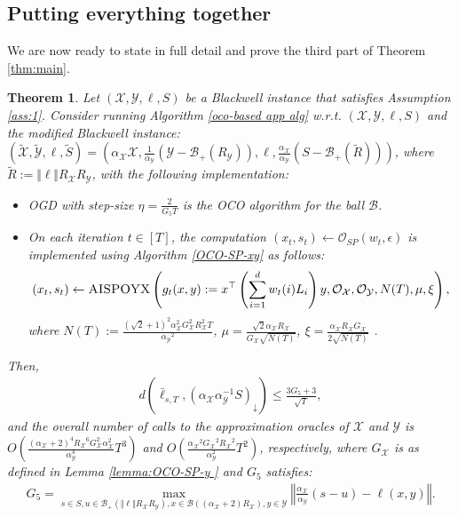 \documentclass[a4paper,12pt]{article}
\newtheorem{theorem} {Theorem}
\newcommand{\mY}{\mathcal{Y}}
\newcommand{\mX}{\mathcal{X}}
\newcommand{\mB}{\mathcal{B}}
\newcommand{\oraclesp}{\mathcal{O}_{SP}}
\newcommand{\oraclex}{\mathcal{O}_{\mX}}
\newcommand{\oracley}{\mathcal{O}_{\mY}}
\begin{document}
\subsection{Putting everything together}
We are now ready to state in full detail and prove the third part of Theorem \ref{thm:main}.
\begin{theorem}\label{thoerem: app on xy} 
Let $(\mX,\mY,\ell,S)$ be a Blackwell instance that satisfies Assumption \ref{ass:1}. Consider running Algorithm \ref{oco-based app  alg} w.r.t. $(\mX,\mY,\ell,S)$ and the modified Blackwell instance:
$(\tilde{\mX}, \tilde{\mY}, \ell, \tilde{S}) = \left({\alpha_{\mX}\mX, \frac{1}{\alpha_{\mY}}(\mY-\mB_+(R_{\mY})), \ell, \frac{\alpha_{\mX}}{\alpha_{\mY}}(S-\mB_{+}(\tilde{R}))}\right)$,
where  $\tilde{R}:=\Vert \ell \Vert R_\mX R_\mY$, with the following implementation:
\begin{itemize}
\item
OGD with step-size $\eta= \frac{2}{G_5 T}$ is the OCO algorithm for the ball $\mB$.
\item
On each iteration $t\in[T]$, the computation $(x_t,s_t)\gets \oraclesp(w_t, \epsilon)$ is implemented using Algorithm \ref{OCO-SP-xy} as follows:
\begin{align*}
\left(x_t , s_t \right) \gets \textsc{AISPOYX}  \left( g_t(x,y) :=x^\top \left( \sum_{i=1}^d {w_t}(i)L_i \right) y, \oraclex, \oracley, N(T) , \mu ,\xi  \right),
\end{align*}
where $N(T):=\frac{(\sqrt{2}+1)^2\alpha_{\mX}^2 G_{\mX}^2 R_{\mX}^2 T}{{\alpha_{\mY}}^2}$, $\mu= \frac{\sqrt{2}\alpha_{\mX} R_{\mX}}{G_{\mX} \sqrt{N(T)}}$, $\xi= \frac{\alpha_{\mX} R_{\mX}G_{\mX}}{ 2\sqrt{N(T)}}$ .
\end{itemize}
Then, %
\begin{align}\label{eq:s_t conv x y}
d\left(\bar{\ell}_{s,T} , \left(\alpha_{\mX}\alpha_{\mY}^{-1} S \right)_\downarrow \right) \leq \frac{3G_5 +3}{\sqrt{T}} ,
\end{align}
and the overall number of calls to the approximation oracles of $\mX$ and $\mY$   is $O \left( \frac{{(\alpha_{\mX} +2)}^4 {R_{\mX}}^6 G_{\mX}^2 \alpha_{\mX}^2  }{\alpha_{\mY}^4}T^3\right)$ and $O \left( \frac{{\alpha_{\mX}}^2{G_\mX}^2 {R_{\mX}}^2 }{\alpha_{\mY}^2} T^2 \right)$, respectively, where $G_{\mX}$ is as defined in Lemma \ref{lemma:OCO-SP-y } and $G_5$ satisfies: 
\begin{align*}
G_5=\max_{s\in S,u \in \mB_+(\Vert \ell \Vert R_\mX R_\mY),x \in \mB((\alpha_{\mX} +2) R_{\mX}) ,y \in \mY} \left\Vert\frac{\alpha_{\mX}}{\alpha_{\mY}}(s- u) - \ell (x,y)\right\Vert.
\end{align*}
\end{theorem}
\end{document}
